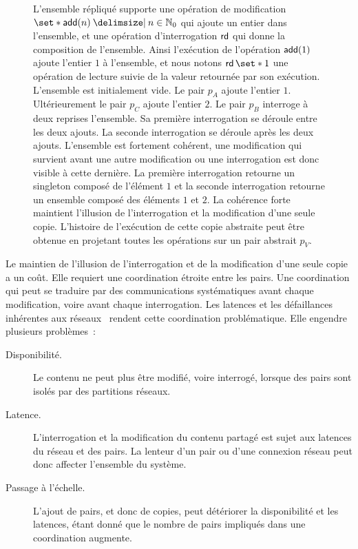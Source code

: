 \begin{figure}[htb]
{L'ensemble répliqué supporte une opération de modification $\set*{\trm{add}(n) \given n \in \mathbb{N}_0}$ qui ajoute un entier dans l'ensemble, et une opération d'interrogation $\operatorname{\mathsf{rd}}$ qui donne la composition de l'ensemble.
Ainsi l'exécution de l'opération $\operatorname{\mathsf{add}}(1)$ ajoute l'entier $1$ à l'ensemble, et nous notons $\trm{rd} \set*{1}$ une opération de lecture suivie de la valeur retournée par son exécution.
L'ensemble est initialement vide.
Le pair $p_A$ ajoute l'entier $1$.
Ultérieurement le pair $p_C$ ajoute l'entier $2$.
Le pair $p_B$ interroge à deux reprises l'ensemble.
Sa première interrogation se déroule entre les deux ajouts.
La seconde interrogation se déroule après les deux ajouts.
L'ensemble est fortement cohérent, une modification qui survient avant une autre modification ou une interrogation est donc visible à cette dernière.
La première interrogation retourne un singleton composé de l'élément $1$ et la seconde interrogation retourne un ensemble composé des éléments $1$ et $2$.
La cohérence forte maintient l'illusion de l'interrogation et la modification d'une seule copie.
 L'histoire de l'exécution de cette copie abstraite peut être obtenue en projetant toutes les opérations sur un pair abstrait $p_V$.
}\label{fig:strong-consistency}
\end{figure}

Le maintien de l'illusion de l'interrogation et de la modification d'une seule copie a un coût.
Elle requiert une coordination étroite entre les pairs.
Une coordination qui peut se traduire par des communications systématiques avant chaque modification, voire avant chaque interrogation.
Les latences et les défaillances inhérentes aux réseaux~\cite{rotem_falalcies_2006} rendent cette coordination problématique.
Elle engendre plusieurs problèmes~:

\begin{description}
    \item[Disponibilité.] Le contenu ne peut plus être modifié, voire interrogé, lorsque des pairs sont isolés par des partitions réseaux.
    \item[Latence.] L'interrogation et la modification du contenu partagé est sujet aux latences du réseau et des pairs.
    La lenteur d'un pair ou d'une connexion réseau peut donc affecter l'ensemble du système.
    \item[Passage à l'échelle.] L'ajout de pairs, et donc de copies, peut détériorer la disponibilité et les latences, étant donné que le nombre de pairs impliqués dans une coordination augmente.
\end{description}


